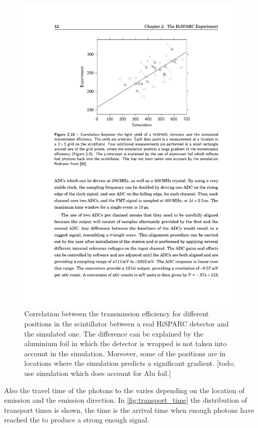\begin{figure}
    \centering
    \includegraphics{plots/station/scintilator_transmission_compared}
    \caption{Correlation between the transmission efficiency for different positions in the scintillator between a real HiSPARC detector and the simulated one. The difference can be explained by the aluminium foil in which the detector is wrapped is not taken into account in the simulation. Moreover, some of the positions are in locations where the simulation predicts a significant gradient. [todo; use simulation which does account for Alu foil.]}
    \label{fig:scintilator_transmission_compared}
\end{figure}

Also the travel time of the photons to the \pmt varies depending on the location of emission and the emission direction. In \cref{fig:transport_time} the distribution of transport times is shown, the time is the arrival time when enough photons have reached the \pmt to produce a strong enough signal.

